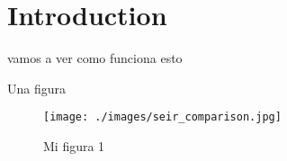 \section{Introduction}

vamos a ver como funciona esto

Una figura

\begin{figure}[htb]
\centering
\texttt{[image: ./images/seir\_comparison.jpg]}
\caption{Mi figura 1}
\label{fig:seir1}
\end{figure}

